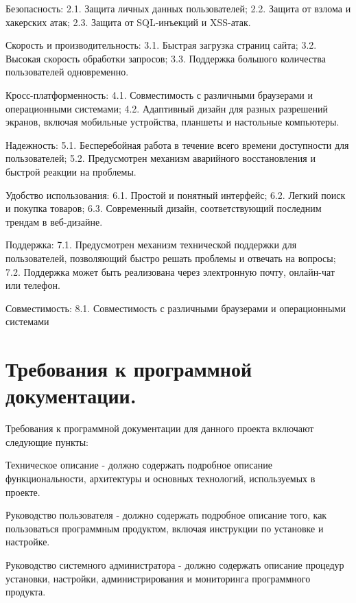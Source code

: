     Безопасность:
    2.1. Защита личных данных пользователей;
    2.2. Защита от взлома и хакерских атак;
    2.3. Защита от SQL-инъекций и XSS-атак.

    Скорость и производительность:
    3.1. Быстрая загрузка страниц сайта;
    3.2. Высокая скорость обработки запросов;
    3.3. Поддержка большого количества пользователей одновременно.

    Кросс-платформенность:
    4.1. Совместимость с различными браузерами и операционными системами;
    4.2. Адаптивный дизайн для разных разрешений экранов, включая мобильные устройства, планшеты и настольные компьютеры.

    Надежность:
    5.1. Бесперебойная работа в течение всего времени доступности для пользователей;
    5.2. Предусмотрен механизм аварийного восстановления и быстрой реакции на проблемы.

    Удобство использования:
    6.1. Простой и понятный интерфейс;
    6.2. Легкий поиск и покупка товаров;
    6.3. Современный дизайн, соответствующий последним трендам в веб-дизайне.

    Поддержка:
    7.1. Предусмотрен механизм технической поддержки для пользователей, позволяющий быстро решать проблемы и отвечать на вопросы;
    7.2. Поддержка может быть реализована через электронную почту, онлайн-чат или телефон.

    Совместимость:
    8.1. Совместимость с различными браузерами и операционными системами









\newpage
\section{Требования к программной документации.}




Требования к программной документации для данного проекта включают следующие пункты:

    Техническое описание - должно содержать подробное описание функциональности, архитектуры и основных технологий, используемых в проекте.

    Руководство пользователя - должно содержать подробное описание того, как пользоваться программным продуктом, включая инструкции по установке и настройке.

    Руководство системного администратора - должно содержать описание процедур установки, настройки, администрирования и мониторинга программного продукта.

